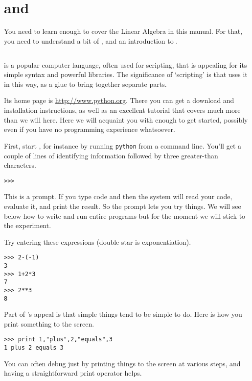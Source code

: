 \chapter{\python{} and \sage{}}

You need to learn enough \sage{} to cover the Linear Algebra
in this manual.
For that, you need to understand a bit of \python{}, and an
introduction to \sage.




\section{\python}
\python{} is a popular computer language, often used for scripting,
that is appealing for its simple syntax and powerful libraries.
The significance of `scripting' is that \sage{} uses it in this way,
as a glue to bring together separate parts.

Its home page is \url{http://www.python.org}.
There you can get a download and installation instructions, as well as 
an excellent tutorial that covers much more than we will here.
Here we will acquaint you with enough \python{} to get started, possibly
even if you have no programming experience whatsoever.

First, start \python, for instance by running 
\lstinline[style=inline]!python!
from a command line.
You'll get a couple of lines of 
identifying information followed by three greater-than
characters.
\begin{lstlisting}[style=python]
>>>   
\end{lstlisting}
This is a prompt.
If you type \python{} code and  then the system
will read your code, evaluate it, and print the result.
So the prompt lets you try things.
We will see below how to write and run entire \python{} programs
but for the moment we will stick to the experiment. 

Try entering these expressions (double star is exponentiation).
\begin{lstlisting}[style=python]
>>> 2-(-1)
3
>>> 1+2*3
7
>>> 2**3
8  
\end{lstlisting}

Part of \python's appeal is that simple things tend to be simple to do.
Here is how you print something to the screen.
\begin{lstlisting}[style=python]
>>> print 1,"plus",2,"equals",3
1 plus 2 equals 3
\end{lstlisting}
You can often debug just by printing things to the screen at
various steps, and having a straightforward print operator helps. 

